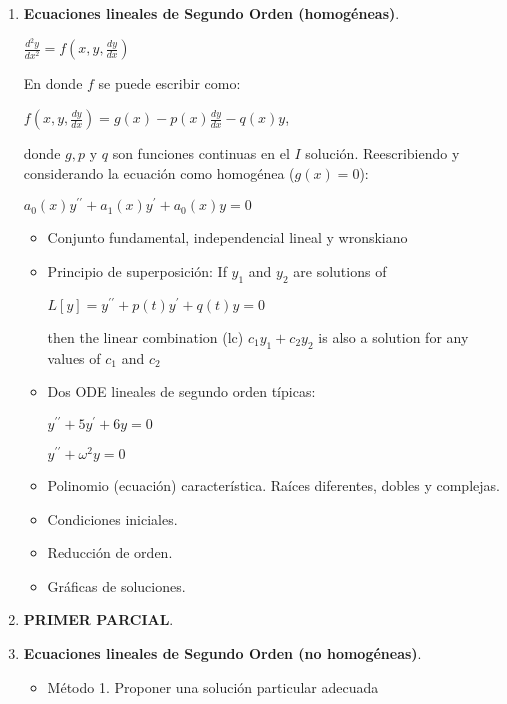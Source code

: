 \documentclass[twoside, twocolumn, 10pt]{article}
\begin{document}
{\begin{small}
\begin{enumerate}
\item \textbf{Ecuaciones lineales de Segundo Orden (homogéneas)}. 
    \begin{center}
    $\frac{d^{2}y}{dx^{2}}=f(x,y,\frac{dy}{dx})$ 
    \end{center}

    En donde $f$ se puede escribir como:

    \begin{center}
    $f(x,y,\frac{dy}{dx})=g(x)-p(x)\frac{dy}{dx}-q(x)y$, 
    \end{center}
    donde
    $g,p$ y $q$ son funciones continuas en el $I$ solución.
    Reescribiendo y considerando la ecuación como homogénea ($g(x)=0$): 
    \begin{center}
    $a_{0}(x)y^{\prime\prime} + a_{1}(x)y^{\prime} + a_{0}(x)y = 0$
    \end{center}
\begin{itemize}
    \item Conjunto fundamental, independencial lineal y wronskiano
    \item Principio de superposición:
        If $y_{1}$ and $y_{2}$ are solutions of 
        \begin{center}
        $L[y]=y^{\prime\prime} + p(t)y^{\prime} + q(t)y=0$
        \end{center}
        then the linear combination (lc) $c_{1}y_{1}+c_{2}y_{2}$ is also a
        solution for any values of $c_{1}$ and $c_{2}$

    \item Dos ODE lineales de segundo orden típicas:
    \begin{center}
        $y^{\prime\prime}+5y^{\prime}+6y=0$ 

        $y^{\prime\prime}+\omega^{2}y=0$
    \end{center}
    \item Polinomio (ecuación) característica. Raíces diferentes, dobles y complejas.
    \item Condiciones iniciales.
    \item Reducción de orden.
    \item Gráficas de soluciones.



\end{itemize} 
\item \textbf{PRIMER PARCIAL}. 
\item \textbf{Ecuaciones lineales de Segundo Orden (no homogéneas)}. 
\begin{itemize}
    \item Método 1. Proponer una solución particular adecuada


\end{itemize}
\end{enumerate}
\end{small}}
\end{document}
